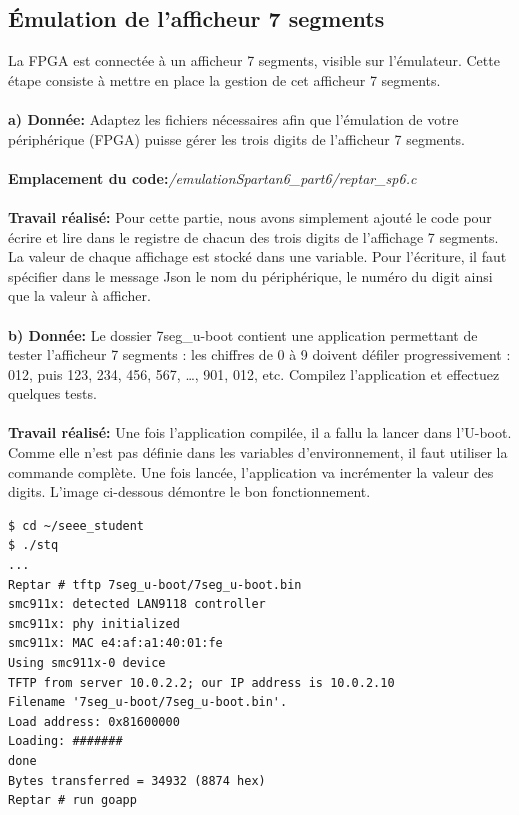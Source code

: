 \subsection{Émulation de l'afficheur 7 segments}
La FPGA est connectée à un afficheur 7 segments, visible sur l’émulateur. Cette étape consiste à mettre
en place la gestion de cet afficheur 7 segments.\\\\
\textbf{a) Donnée: }Adaptez les fichiers nécessaires afin que l'émulation de votre périphérique (FPGA) puisse gérer les
trois digits de l’afficheur 7 segments. \\\\
\textbf{Emplacement du code:}\textit{/emulationSpartan6\_part6/reptar\_sp6.c}\\\\
\textbf{Travail réalisé: }Pour cette partie, nous avons simplement ajouté le code pour écrire et lire dans le registre de chacun des trois digits de l'affichage 7 segments. La valeur de chaque affichage est stocké dans une variable. Pour l'écriture, il faut spécifier dans le message Json le nom du périphérique, le numéro du digit ainsi que la valeur à afficher.\\\\
\textbf{b) Donnée: }Le dossier 7seg\_u-boot contient une application permettant de tester l’afficheur 7 segments : les
chiffres de 0 à 9 doivent défiler progressivement : 012, puis 123, 234, 456, 567, …, 901, 012, etc.
Compilez l'application et effectuez quelques tests.\\\\
\textbf{Travail réalisé: }Une fois l'application compilée, il a fallu la lancer dans l'U-boot. Comme elle n'est pas définie dans les variables d'environnement, il faut utiliser la commande complète. Une fois lancée, l'application va incrémenter la valeur des digits. L'image ci-dessous démontre le bon fonctionnement.
\begin{lstlisting}
$ cd ~/seee_student
$ ./stq
...
Reptar # tftp 7seg_u-boot/7seg_u-boot.bin
smc911x: detected LAN9118 controller
smc911x: phy initialized
smc911x: MAC e4:af:a1:40:01:fe
Using smc911x-0 device
TFTP from server 10.0.2.2; our IP address is 10.0.2.10
Filename '7seg_u-boot/7seg_u-boot.bin'.
Load address: 0x81600000
Loading: #######
done
Bytes transferred = 34932 (8874 hex)
Reptar # run goapp
\end{lstlisting}
